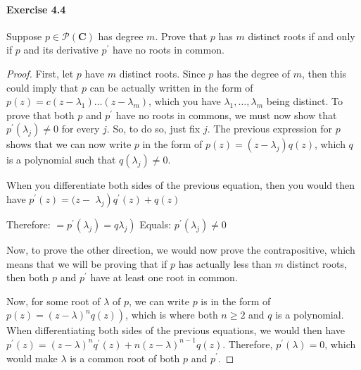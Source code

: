 \documentclass{article}
\theoremstyle{definition}
\begin{document}
\paragraph{Exercise 4.4} Suppose $p \in \mathcal{P}(\mathbf{C})$ has degree $m$. Prove that $p$ has $m$ distinct roots if and only if $p$ and its derivative $p^{\prime}$ have no roots in common.
\begin{proof}
    First, let $p$ have $m$ distinct roots. Since $p$ has the degree of $m$, then this could imply that $p$ can be actually written in the form of $p(z)=c\left(z-\lambda_1\right) \ldots\left(z-\lambda_m\right)$, which you have $\lambda_1, \ldots, \lambda_m$ being distinct.
To prove that both $p$ and $p^{\prime}$ have no roots in commons, we must now show that $p^{\prime}\left(\lambda_j\right) \neq 0$ for every $j$. So, to do so, just fix $j$. The previous expression for $p$ shows that we can now write $p$ in the form of $p(z)=\left(z-\lambda_j\right) q(z)$, which $q$ is a polynomial such that $q\left(\lambda_j\right) \neq 0$.

When you differentiate both sides of the previous equation, then you would then have $p^{\prime}(z)=(z-$ $\left.\lambda_j\right) q^{\prime}(z)+q(z)$

Therefore: $\left.=p^{\prime}\left(\lambda_j\right)=q \lambda_j\right)$
Equals: $p^{\prime}\left(\lambda_j\right) \neq 0$

Now, to prove the other direction, we would now prove the contrapositive, which means that we will be proving that if $p$ has actually less than $m$ distinct roots, then both $p$ and $p^{\prime}$ have at least one root in common.

Now, for some root of $\lambda$ of $p$, we can write $p$ is in the form of $\left.p(z)=(z-\lambda)^n q(z)\right)$, which is where both $n \geq 2$ and $q$ is a polynomial. When differentiating both sides of the previous equations, we would then have $p^{\prime}(z)=(z-\lambda)^n q^{\prime}(z)+n(z-\lambda)^{n-1} q(z)$.
Therefore, $p^{\prime}(\lambda)=0$, which would make $\lambda$ is a common root of both $p$ and $p^{\prime}$.
\end{proof}
\end{document}
